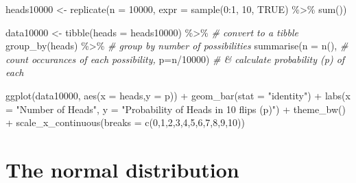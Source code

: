 \documentclass[
  oneside]{book}
\newenvironment{Shaded}{\begin{snugshade}}{\end{snugshade}}
\newcommand{\AttributeTok}[1]{\textcolor[rgb]{0.77,0.63,0.00}{#1}}
\newcommand{\CommentTok}[1]{\textcolor[rgb]{0.56,0.35,0.01}{\textit{#1}}}
\newcommand{\ConstantTok}[1]{\textcolor[rgb]{0.00,0.00,0.00}{#1}}
\newcommand{\DecValTok}[1]{\textcolor[rgb]{0.00,0.00,0.81}{#1}}
\newcommand{\FunctionTok}[1]{\textcolor[rgb]{0.00,0.00,0.00}{#1}}
\newcommand{\NormalTok}[1]{#1}
\newcommand{\OtherTok}[1]{\textcolor[rgb]{0.56,0.35,0.01}{#1}}
\newcommand{\SpecialCharTok}[1]{\textcolor[rgb]{0.00,0.00,0.00}{#1}}
\newcommand{\StringTok}[1]{\textcolor[rgb]{0.31,0.60,0.02}{#1}}
\begin{document}
\begin{Shaded}
\begin{Highlighting}[]
\NormalTok{heads10000 }\OtherTok{\textless{}{-}} \FunctionTok{replicate}\NormalTok{(}\AttributeTok{n =} \DecValTok{10000}\NormalTok{, }\AttributeTok{expr =} \FunctionTok{sample}\NormalTok{(}\DecValTok{0}\SpecialCharTok{:}\DecValTok{1}\NormalTok{, }\DecValTok{10}\NormalTok{, }\ConstantTok{TRUE}\NormalTok{) }\SpecialCharTok{\%\textgreater{}\%} \FunctionTok{sum}\NormalTok{())}

\NormalTok{data10000 }\OtherTok{\textless{}{-}} \FunctionTok{tibble}\NormalTok{(}\AttributeTok{heads =}\NormalTok{ heads10000) }\SpecialCharTok{\%\textgreater{}\%}   \CommentTok{\# convert to a tibble}
                \FunctionTok{group\_by}\NormalTok{(heads) }\SpecialCharTok{\%\textgreater{}\%}     \CommentTok{\# group by number of possibilities }
                \FunctionTok{summarise}\NormalTok{(}\AttributeTok{n =} \FunctionTok{n}\NormalTok{(), }\CommentTok{\# count occurances of each possibility,}
                          \AttributeTok{p=}\NormalTok{n}\SpecialCharTok{/}\DecValTok{10000}\NormalTok{) }\CommentTok{\# \& calculate probability (p) of each}

\FunctionTok{ggplot}\NormalTok{(data10000, }\FunctionTok{aes}\NormalTok{(}\AttributeTok{x =}\NormalTok{ heads,}\AttributeTok{y =}\NormalTok{ p)) }\SpecialCharTok{+} 
  \FunctionTok{geom\_bar}\NormalTok{(}\AttributeTok{stat =} \StringTok{"identity"}\NormalTok{) }\SpecialCharTok{+} 
  \FunctionTok{labs}\NormalTok{(}\AttributeTok{x =} \StringTok{"Number of Heads"}\NormalTok{, }\AttributeTok{y =} \StringTok{"Probability of Heads in 10 flips (p)"}\NormalTok{) }\SpecialCharTok{+}
  \FunctionTok{theme\_bw}\NormalTok{() }\SpecialCharTok{+}
  \FunctionTok{scale\_x\_continuous}\NormalTok{(}\AttributeTok{breaks =} \FunctionTok{c}\NormalTok{(}\DecValTok{0}\NormalTok{,}\DecValTok{1}\NormalTok{,}\DecValTok{2}\NormalTok{,}\DecValTok{3}\NormalTok{,}\DecValTok{4}\NormalTok{,}\DecValTok{5}\NormalTok{,}\DecValTok{6}\NormalTok{,}\DecValTok{7}\NormalTok{,}\DecValTok{8}\NormalTok{,}\DecValTok{9}\NormalTok{,}\DecValTok{10}\NormalTok{))}
\end{Highlighting}
\end{Shaded}

\hypertarget{the-normal-distribution}{%
\section{The normal distribution}\label{the-normal-distribution}}
\end{document}
